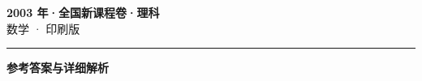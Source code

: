 \documentclass[zihao=5, a4paper]{ctexart}
\begin{document}
\begin{center}
  {\Large\bfseries 2003 年·全国新课程卷·理科}\\[4pt]
  {\large 数学 · 印刷版}
\end{center}
\medskip
{}

\par\bigskip\hrule\bigskip
{}
\begin{center}{\large\bfseries 参考答案与详细解析}\end{center}
\smallskip

\end{document}
